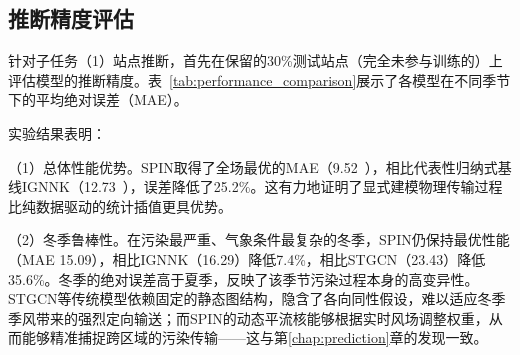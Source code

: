 \subsection{推断精度评估}
\label{subsec:station_inference}

针对子任务（1）站点推断，首先在保留的30\%测试站点（完全未参与训练的）上评估模型的推断精度。表~\ref{tab:performance_comparison}展示了各模型在不同季节下的平均绝对误差（MAE）。

\begin{table}[htbp]
\centering
\caption{未观测站点（30\% Hold-out）的推断性能对比}
\caption*{评价指标为MAE（\ug{}），对比方法涵盖特征工程类（XGBoost、MLP）、时序类（LSTM、GRU）、时空图网络类（STGCN、IGNNK）以及本文提出的物理启发类方法SPIN。}
\label{tab:performance_comparison}
\end{table}

实验结果表明：

（1）总体性能优势。SPIN取得了全场最优的MAE（9.52~\ug{}），相比代表性归纳式基线IGNNK（12.73~\ug{}），误差降低了25.2\%。这有力地证明了显式建模物理传输过程比纯数据驱动的统计插值更具优势。

（2）冬季鲁棒性。在污染最严重、气象条件最复杂的冬季，SPIN仍保持最优性能（MAE 15.09），相比IGNNK（16.29）降低7.4\%，相比STGCN（23.43）降低35.6\%。冬季的绝对误差高于夏季，反映了该季节污染过程本身的高变异性。STGCN等传统模型依赖固定的静态图结构，隐含了各向同性假设，难以适应冬季季风带来的强烈定向输送；而SPIN的动态平流核能够根据实时风场调整权重，从而能够精准捕捉跨区域的污染传输——这与第\ref{chap:prediction}章\ModelPred{}的发现一致。

